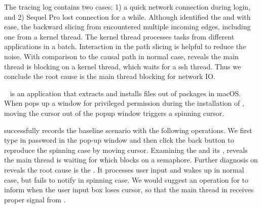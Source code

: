 The tracing log contains two cases: 1) a quick network connection during login,
and 2) Sequel Pro lost connection for a while. Although \xxx identified the
\spinningnode and \similarnode with ease, the backward slicing from \similarnode
encountered multiple incoming edges, including one from a kernel thread.
The kernel thread processes tasks from different applications in a batch.
Interaction in the path slicing is helpful to reduce the noise. With comparison
to the causal path in normal case, \xxx reveals the main thread is blocking on a
kernel thread, which waits for a ssh thread. Thus we conclude the root cause is
the main thread blocking for network IO.


~\cite{Installer} is an application that extracts and installs
files out of  packages in macOS. When  pops up a window
for privileged permission during the installation of ,
moving the cursor out of the popup window triggers a spinning cursor.

\xxx successfully records the baseline scenario with the following operations.
We first type in password in the pop-up window and then click the back button to
reproduce the spinning case by moving cursor. Examining the \spinningnode and
its \similarnode, \xxx reveals the main thread is waiting for  which
blocks on a semaphore. Further diagnosis on  reveals the root cause
is the . It processes user input and wakes up  in
normal case, but fails to notify  in spinning case. We would suggest
an operation for  to inform  when the user input box
loses cursor, so that the main thread in  receives proper signal
from .

